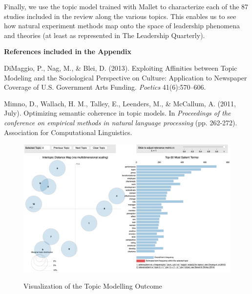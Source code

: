 \documentclass[english]{article}
\begin{document}
\begin{appendices}
Finally, we use the topic model trained with Mallet to characterize each
of the 87 studies included in the review along the various topics. This
enables us to see how natural experiment methods map onto the space of
leadership phenomena and theories (at least as represented in The
Leadership Quarterly).

\noindent \textbf{References included in the Appendix}

\begin{list}{}{\setlength\itemindent{-\leftmargin}}

\item DiMaggio, P., Nag, M., \& Blei, D. (2013). Exploiting Affinities
    between Topic Modeling and the Sociological Perspective on Culture:
    Application to Newspaper Coverage of U.S. Government Arts Funding.
    \textit{Poetics} 41(6):570–606.

\item Mimno, D., Wallach, H. M., Talley, E., Leenders, M., \& McCallum, A. (2011,
July). Optimizing semantic coherence in topic models. In \textit{Proceedings of
the conference on empirical methods in natural language processing} (pp.
262-272). Association for Computational Linguistics.

\end{list}

\begin{figure}
	\centering
	\caption{Visualization of the Topic Modelling Outcome}
	\includegraphics[width=1\textwidth]{B_1}
	\label{fig:pyldavis}
\end{figure}



\end{appendices}

\clearpage

\end{document}
